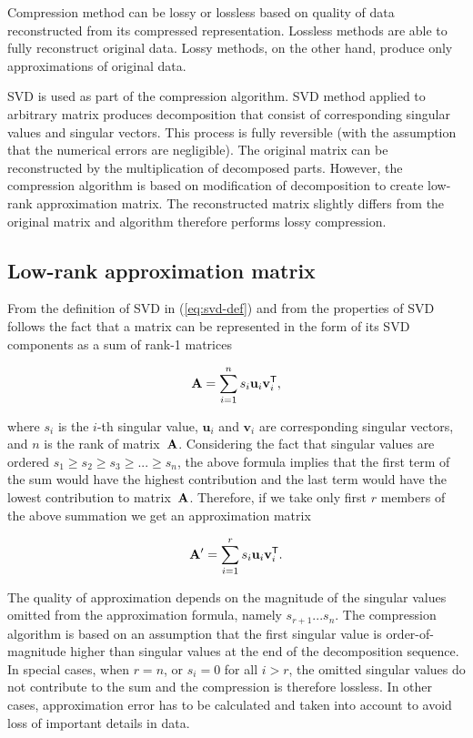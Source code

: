 Compression method can be lossy or lossless based on quality of data reconstructed from its compressed representation. Lossless methods are able to fully reconstruct original data. Lossy methods, on the other hand, produce only approximations of original data. 

SVD is used as part of the compression algorithm. SVD method applied to arbitrary matrix produces decomposition that consist of corresponding singular values and singular vectors. This process is fully reversible (with the assumption that the numerical errors are negligible). The original matrix can be reconstructed by the multiplication of decomposed parts. However, the compression algorithm is based on modification of decomposition to create low-rank approximation matrix. The reconstructed matrix slightly differs from the original matrix and algorithm therefore performs lossy compression.

\subsection{Low-rank approximation matrix}

From the definition of SVD in (\ref{eq:svd-def}) and from the properties of SVD follows the fact that a matrix can be represented in the form of its SVD components as a sum of rank-1 matrices

\begin{equation}
\mathbf{A}=\sum_{i=1}^{n} s_{i}\mathbf{u}_{i}\mathbf{v}_{i}^{\mathsf{T}},
\label{eq:svd-expansion}
\end{equation}

\noindent
where $s_i$ is the $i$-th singular value, $\mathbf{u}_i$ and $\mathbf{v}_i$ are corresponding singular vectors, and $n$ is the rank of matrix~$\mathbf{A}$. Considering the fact that singular values are ordered $s_{1} \geq s_{2} \geq s_{3} \geq ... \geq s_{n}$, the above formula implies that the first term of the sum would have the highest contribution and the last term would have the lowest contribution to matrix~$\mathbf{A}$. Therefore, if we take only first $r$ members of the above summation we get an approximation matrix

\begin{equation}
\mathbf{A'}=\sum_{i=1}^{r} s_{i}\mathbf{u}_{i}\mathbf{v}_{i}^{\mathsf{T}}.
\label{eq:svd-approx-expansion}
\end{equation}

The quality of approximation depends on the magnitude of the singular values omitted from the approximation formula, namely $s_{r+1} ...  s_{n}$. The compression algorithm is based on an assumption that the first singular value is order-of-magnitude higher than singular values at the end of the decomposition sequence. In special cases, when $r=n$, or $s_{i}=0$ for all $i > r$, the omitted singular values do not contribute to the sum and the compression is therefore lossless. In other cases, approximation error has to be calculated and taken into account to avoid loss of important details in data.


